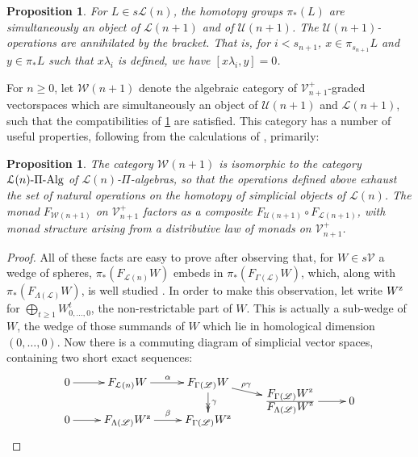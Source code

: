 \documentclass[11pt]{amsart}
\theoremstyle{plain}
\newtheorem{prop}[thm]{Proposition}
\theoremstyle{definition}
\newcommand{\scrL}{\mathscr{L}}
\newcommand{\calW}{\mathcal{W}}
\newcommand{\calU}{\mathcal{U}}
\newcommand{\calL}{\mathcal{L}}
\newcommand{\calV}{\mathcal{V}}
\theoremstyle{plain}
\newcommand{\LieOperad}{{\scrL}}
\newcommand{\vect}[2]{\calV^{#1}_{#2}}
\newcommand{\PiAlg}{\textup{-$\Pi$-Alg}}
\begin{document}
\begin{Lie algebras in characteristic 2 and their homotopy operations}
\begin{prop}\label{compatibilities between U and L in W}
For $L\in s\calL(n)$, the homotopy groups $\pi_*(L)$ are simultaneously an object of $\calL(n+1)$ and of $\calU(n+1)$. The $\calU(n+1)$-operations are annihilated by the bracket. That is, for $i<s_{n+1}$, $x\in\pi_{s_{n+1}}L$ and $y\in \pi_*L$ such that $x\lambda_i$ is defined, we have $[x\lambda_i,y]=0$.
\end{prop}
For $n\geq0$, let $\calW(n+1)$ denote the algebraic category of $\vect{+}{n+1}$-graded vectorspaces which are simultaneously an object of $\calU(n+1)$ and $\calL(n+1)$, such that the compatibilities of \ref{compatibilities between U and L in W} are satisfied. This category has a number of useful properties, following from the calculations of \cite{6Author.pdf}, primarily:
\begin{prop}\label{prop on Wnplus1 being the pialgs for Wn}
The category $\calW(n+1)$ is isomorphic to the category $\calL(n)\PiAlg$ of $\calL(n)$-$\Pi$-algebras, so that the operations defined above exhaust the set of natural operations on the homotopy of simplicial objects of $\calL(n)$.
The monad $F_{\calW(n+1)}$ on $\vect{+}{n+1}$ factors as a composite $F_{\calU(n+1)}\circ F_{\calL(n+1)}$, with monad structure arising from a distributive law \cite{BeckDistLaws} of monads on $\vect{+}{n+1}$.
\end{prop}
\begin{proof}
All of these facts are easy to prove after observing that, for $W\in s\calV$ a wedge of spheres, $\pi_*(F_{\calL(n)}W)$ embeds in $\pi_*(F_{\Gamma(\LieOperad)}W)$, which, along with $\pi_*(F_{\Lambda(\LieOperad)}W)$, is well studied \cite{6Author.pdf}. In order to make this observation, let write $W^\textup{z}$ for $\bigoplus_{t\geq1}W_{0,\ldots,0}^t$, the non-restrictable part of $W$. This is actually a sub-wedge of $W$, the wedge of those summands of $W$ which lie in homological dimension $(0,\ldots,0)$. Now there is a commuting diagram of simplicial vector spaces, containing two short exact sequences:
\[\xymatrix@R=-2mm{
0
\ar[r]
&%
F_{\calL(n)}W
\ar[r]^{\alpha}
&%
F_{\Gamma(\LieOperad)}W
\ar[dr]^-(.4){\rho\gamma}\ar@{->>}[dd]^-{\gamma}
&%
\\%
&&&\frac{\displaystyle F_{\Gamma(\LieOperad)}W^\textup{z}}{\displaystyle F_{\Lambda(\LieOperad)}W^\textup{z}}
\ar[r]
&
0
\\
0
\ar[r]
&%
F_{\Lambda(\LieOperad)}W^\textup{z}
\ar[r]^{\beta}
&%
F_{\Gamma(\LieOperad)}W^\textup{z}
}\]
\end{proof}
\end{Lie algebras in characteristic 2 and their homotopy operations}
\end{document}
